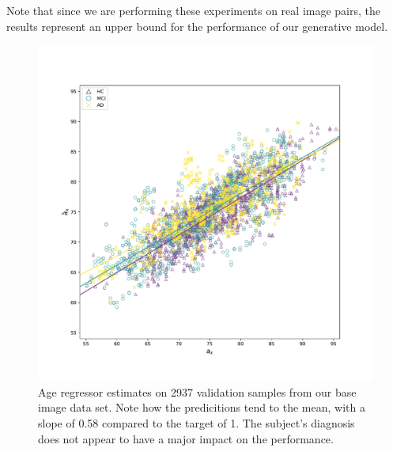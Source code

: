 Note that since we are performing these experiments on real image pairs, the results represent an upper bound for the performance of our generative model.

\begin{figure}
	\centering
	\includegraphics[width=.9\linewidth]{images/age_plots/xr_xrhat} 
	\vspace*{-15pt}
	\caption{Age regressor estimates on 2937 validation samples from our base image data set. Note how the predicitions tend to the mean, with a slope of 0.58 compared to the target of 1. The subject's diagnosis does not appear to have a major impact on the performance.}
	\label{fig:regxrxrhat}
\end{figure}

